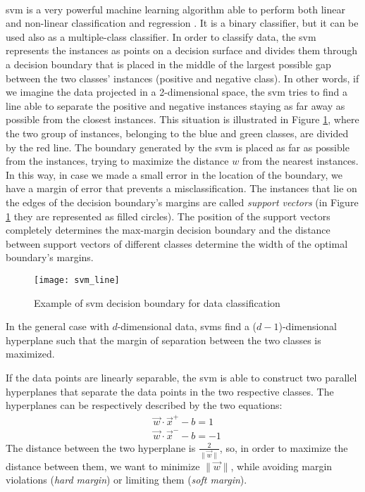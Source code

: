 \paragraph{} \acf{svm} is a very powerful machine learning algorithm able to perform both linear and non-linear classification and regression \cite{OReilly:handsonML}. It is a binary classifier, but it can be used also as a multiple-class classifier. In order to classify data, the \acs{svm} represents the instances as points on a decision surface and divides them through a decision boundary that is placed in the middle of the largest possible gap between the two classes' instances (positive and negative class). In other words, if we imagine the data projected in a 2-dimensional space, the \acs{svm} tries to find a line able to separate the positive and negative instances staying as far away as possible from the closest instances. This situation is illustrated in Figure \ref{fig:svm_line}, where the two group of instances, belonging to the blue and green classes, are divided by the red line. The boundary generated by the \acs{svm} is placed as far as possible from the instances, trying to maximize the distance $w$ from the nearest instances. In this way, in case we made a small error in the location of the boundary, we have a margin of error that prevents a misclassification. The instances that lie on the edges of the decision boundary's margins are called \textit{support vectors} (in Figure \ref{fig:svm_line} they are represented as filled circles). The position of the support vectors completely determines the max-margin decision boundary and the distance between support vectors of different classes determine the width of the optimal boundary’s margins.
\begin{figure}[htbp]
    \centering
    \texttt{[image: svm\_line]}
    \caption{Example of \acs{svm} decision boundary for data classification}
    \label{fig:svm_line}
\end{figure}

In the general case with $d$-dimensional data, \acsp{svm} find a ($d-1$)-dimensional hyperplane such that the margin of separation between the two classes is maximized.

If the data points are linearly separable, the \acs{svm} is able to construct two parallel hyperplanes that separate the data points in the two respective classes. The hyperplanes can be respectively described by the two equations:
\begin{align}
    &\vec{w} \cdot \vec{x}^{+}-b=1 \\
    &\vec{w} \cdot \vec{x}^{-}-b=-1
\end{align}
The distance between the two hyperplane is $\frac{2}{\|\vec{w}\|}$, so, in order to maximize the distance between them, we want to minimize $\|\vec{w}\|$, while avoiding margin violations (\textit{hard margin}) or limiting them (\textit{soft margin}).

